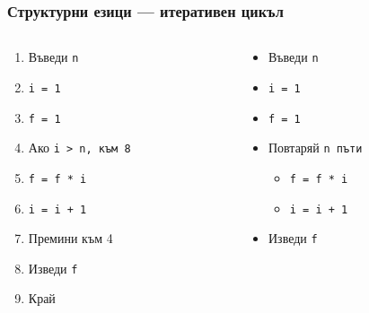 \documentclass{beamer}
\begin{document}
\begin{frame}
  \frametitle{Структурни езици — итеративен цикъл}

  \begin{columns}
    \begin{column}{.5\textwidth}
      \begin{enumerate}
      \item Въведи \tt n
      \item \tt{i = 1}
      \item \tt{f = 1}
      \item Ако \tt{i > n}, към 8
      \item \tt{f = f * i}
      \item \tt{i = i + 1}
      \item Премини към 4
      \item Изведи \tt f
      \item Край
      \end{enumerate}
    \end{column}
    \begin{column}{.5\textwidth}
      \begin{itemize}
      \item Въведи \tt n
      \item \tt{i = 1}
      \item \tt{f = 1}
      \item Повтаряй \tt n пъти
        \begin{itemize}
        \item \tt{f = f * i}
        \item \tt{i = i + 1}
        \end{itemize}
      \item Изведи \tt f
      \end{itemize}
    \end{column}
  \end{columns}
\end{frame}
\end{document}
